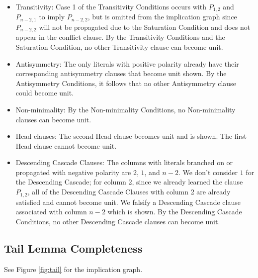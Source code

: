 \documentclass[a4paper,UKenglish,cleveref, autoref, thm-restate]{lipics-v2021}
\begin{document}
\begin{itemize}
    \item Transitivity: Case 1 of the Transitivity Conditions occurs with $P_{1, 2}$ and $P_{n - 2, 1}$ to imply $P_{n - 2, 2}$, but is omitted from the implication graph since $P_{n - 2, 2}$ will not be propagated due to the Saturation Condition and does not appear in the conflict clause. By the Transitivity Conditions and the Saturation Condition, no other Transitivity clause can become unit. 
    \item Antisymmetry: The only literals with positive polarity already have their corresponding antisymmetry clauses that become unit shown. By the Antisymmetry Conditions, it follows that no other Antisymmetry clause could become unit. 
    \item Non-minimality: By the Non-minimality Conditions, no Non-minimality clauses can become unit. 
    \item Head clauses: The second Head clause becomes unit and is shown. The first Head clause cannot become unit. 
    \item Descending Cascade Clauses: The columns with literals branched on or propagated with negative polarity are $2$, $1$, and $n - 2$. We don't consider $1$ for the Descending Cascade; for column 2, since we already learned the clause $P_{1, 2}$, all of the Descending Cascade Clauses with column 2 are already satisfied and cannot become unit. We falsify a Descending Cascade clause associated with column $n - 2$ which is shown. By the Descending Cascade Conditions, no other Descending Cascade clauses can become unit. 
\end{itemize}

\subsection{Tail Lemma Completeness}
See Figure \ref{fig:tail} for the implication graph.
\end{document}
